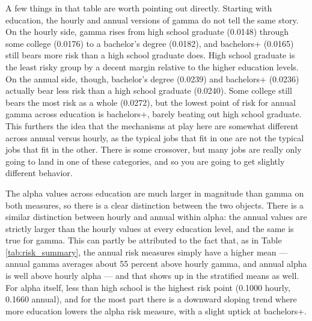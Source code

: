 \documentclass[12pt]{article}
\begin{document}
\begin{onehalfspace}
\begin{table}[H]
    \centering
    \caption{Stratified Means of Gamma and Alpha by Demographic Group (x 100)}
    \label{tab:stratified_means_gamma_alpha}
    \resizebox{0.9\textwidth}{!}{%
        
    }
\end{table}


A few things in that table are worth pointing out directly. Starting with education, the hourly and annual versions of gamma do not tell the same story. On the hourly side, gamma rises from high school graduate (0.0148) through some college (0.0176) to a bachelor's degree (0.0182), and bachelors+ (0.0165) still bears more risk than a high school graduate does. High school graduate is the least risky group by a decent margin relative to the higher education levels. On the annual side, though, bachelor's degree (0.0239) and bachelors+ (0.0236) actually bear less risk than a high school graduate (0.0240). Some college still bears the most risk as a whole (0.0272), but the lowest point of risk for annual gamma across education is bachelors+, barely beating out high school graduate. This furthers the idea that the mechanisms at play here are somewhat different across annual versus hourly, as the typical jobs that fit in one are not the typical jobs that fit in the other. There is some crossover, but many jobs are really only going to land in one of these categories, and so you are going to get slightly different behavior.

The alpha values across education are much larger in magnitude than gamma on both measures, so there is a clear distinction between the two objects. There is a similar distinction between hourly and annual within alpha: the annual values are strictly larger than the hourly values at every education level, and the same is true for gamma. This can partly be attributed to the fact that, as in Table \ref{tab:risk_summary}, the annual risk measures simply have a higher mean --- annual gamma averages about 55 percent above hourly gamma, and annual alpha is well above hourly alpha --- and that shows up in the stratified means as well. For alpha itself, less than high school is the highest risk point (0.1000 hourly, 0.1660 annual), and for the most part there is a downward sloping trend where more education lowers the alpha risk measure, with a slight uptick at bachelors+.


\end{onehalfspace}
\end{document}
